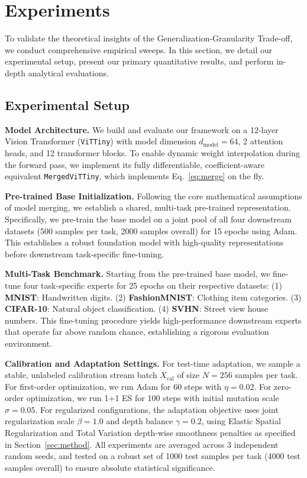 \section{Experiments}
\label{sec:experiments}

To validate the theoretical insights of the Generalization-Granularity Trade-off, we conduct comprehensive empirical sweeps. 
In this section, we detail our experimental setup, present our primary quantitative results, and perform in-depth analytical evaluations.

\subsection{Experimental Setup}

\textbf{Model Architecture.} 
We build and evaluate our framework on a 12-layer Vision Transformer (\texttt{ViTTiny}) with model dimension $d_{\text{model}} = 64$, 2 attention heads, and 12 transformer blocks. 
To enable dynamic weight interpolation during the forward pass, we implement its fully differentiable, coefficient-aware equivalent \texttt{MergedViTTiny}, which implements Eq.~\eqref{eq:merge} on the fly.

\textbf{Pre-trained Base Initialization.}
Following the core mathematical assumptions of model merging, we establish a shared, multi-task pre-trained representation. 
Specifically, we pre-train the base model on a joint pool of all four downstream datasets (500 samples per task, 2000 samples overall) for 15 epochs using Adam. 
This establishes a robust foundation model with high-quality representations before downstream task-specific fine-tuning.

\textbf{Multi-Task Benchmark.} 
Starting from the pre-trained base model, we fine-tune four task-specific experts for 25 epochs on their respective datasets:
(1) \textbf{MNIST}: Handwritten digits.
(2) \textbf{FashionMNIST}: Clothing item categories.
(3) \textbf{CIFAR-10}: Natural object classification.
(4) \textbf{SVHN}: Street view house numbers.
This fine-tuning procedure yields high-performance downstream experts that operate far above random chance, establishing a rigorous evaluation environment.

\textbf{Calibration and Adaptation Settings.} 
For test-time adaptation, we sample a stable, unlabeled calibration stream batch $X_{\text{cal}}$ of size $N = 256$ samples per task. 
For first-order optimization, we run Adam for 60 steps with $\eta = 0.02$. 
For zero-order optimization, we run 1+1 ES for 100 steps with initial mutation scale $\sigma=0.05$. 
For regularized configurations, the adaptation objective uses joint regularization scale $\beta = 1.0$ and depth balance $\gamma = 0.2$, using Elastic Spatial Regularization and Total Variation depth-wise smoothness penalties as specified in Section~\ref{sec:method}.
All experiments are averaged across 3 independent random seeds, and tested on a robust set of 1000 test samples per task (4000 test samples overall) to ensure absolute statistical significance.

